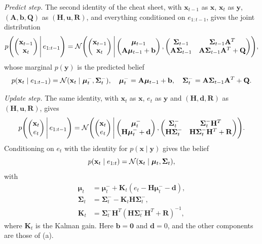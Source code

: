 \documentclass[11pt, a4paper]{exam}
\begin{document}
\begin{exercises}
\begin{parts}
\begin{solution}
        \emph{Predict step.} The second identity of the cheat sheet, with $\mathbf{x}_{t-1}$ as $\mathbf{x}$, $\mathbf{x}_t$ as $\mathbf{y}$, $(\mathbf{A}, \mathbf{b}, \mathbf{Q})$ as $(\mathbf{H}, \mathbf{u}, \mathbf{R})$, and everything conditioned on $e_{1:t-1}$, gives the joint distribution
        \[
            p\rbk*{ \mat{\mathbf{x}_{t-1} \\ \mathbf{x}_t} \Bigg| \, e_{1:t-1} } = \N\rbk*{ \mat{\mathbf{x}_{t-1} \\ \mathbf{x}_t} \Bigg| \mat{\bm{\mu}_{t-1} \\ \mathbf{A} \bm{\mu}_{t-1} + \mathbf{b}}, \mat{ \bm{\Sigma}_{t-1} & \bm{\Sigma}_{t-1} \mathbf{A}^T \\ \mathbf{A} \bm{\Sigma}_{t-1} & \mathbf{A} \bm{\Sigma}_{t-1} \mathbf{A}^T + \mathbf{Q} } },
        \]
        whose marginal $p(\mathbf{y})$ is the predicted belief
        \[
            p(\mathbf{x}_t \mid e_{1:t-1}) = \mathcal{N}(\mathbf{x}_t \mid \bm{\mu}_t^-, \bm{\Sigma}_t^-), \quad \bm{\mu}_t^- = \mathbf{A} \bm{\mu}_{t-1} + \mathbf{b}, \quad \bm{\Sigma}_t^- = \mathbf{A} \bm{\Sigma}_{t-1} \mathbf{A}^T + \mathbf{Q}.
        \]

        \emph{Update step.} The same identity, with $\mathbf{x}_t$ as $\mathbf{x}$, $e_t$ as $\mathbf{y}$ and $(\mathbf{H}, \mathbf{d}, \mathbf{R})$ as $(\mathbf{H}, \mathbf{u}, \mathbf{R})$, gives
        \[
            p\rbk*{ \mat{\mathbf{x}_t \\ e_t} \Bigg| \, e_{1:t-1} } = \N\rbk*{ \mat{\mathbf{x}_t \\ e_t} \Bigg| \mat{\bm{\mu}_t^- \\ \mathbf{H} \bm{\mu}_t^- + \mathbf{d}}, \mat{ \bm{\Sigma}_t^- & \bm{\Sigma}_t^- \mathbf{H}^T \\ \mathbf{H} \bm{\Sigma}_t^- & \mathbf{H} \bm{\Sigma}_t^- \mathbf{H}^T + \mathbf{R} } }.
        \]
        Conditioning on $e_t$ with the identity for $p(\mathbf{x} \mid \mathbf{y})$ gives the belief
        \[
            p(\mathbf{x}_t \mid e_{1:t}) = \mathcal{N}(\mathbf{x}_t \mid \bm{\mu}_t, \bm{\Sigma}_t),
        \]
        with
        \begin{align*}
            \bm{\mu}_t & = \bm{\mu}_t^- + \mathbf{K}_t (e_t - \mathbf{H} \bm{\mu}_t^- - \mathbf{d}), \\
            \bm{\Sigma}_t & = \bm{\Sigma}_t^- - \mathbf{K}_t \mathbf{H} \bm{\Sigma}_t^-, \\
            \mathbf{K}_t & = \bm{\Sigma}_t^- \mathbf{H}^T (\mathbf{H} \bm{\Sigma}_t^- \mathbf{H}^T + \mathbf{R})^{-1},
        \end{align*}
        where $\mathbf{K}_t$ is the Kalman gain. Here $\mathbf{b} = \mathbf{0}$ and $\mathbf{d} = 0$, and the other components are those of (a).
    \end{solution}


\end{parts}
\end{exercises}
\end{document}
